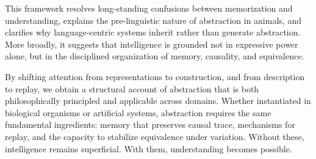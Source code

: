 \documentclass[11pt]{article}
\begin{document}
This framework resolves long-standing confusions between memorization and understanding, explains the pre-linguistic nature of abstraction in animals, and clarifies why language-centric systems inherit rather than generate abstraction. More broadly, it suggests that intelligence is grounded not in expressive power alone, but in the disciplined organization of memory, causality, and equivalence.

By shifting attention from representations to construction, and from description to replay, we obtain a structural account of abstraction that is both philosophically principled and applicable across domains. Whether instantiated in biological organisms or artificial systems, abstraction requires the same fundamental ingredients: memory that preserves causal trace, mechanisms for replay, and the capacity to stabilize equivalence under variation. Without these, intelligence remains superficial. With them, understanding becomes possible.
\end{document}
